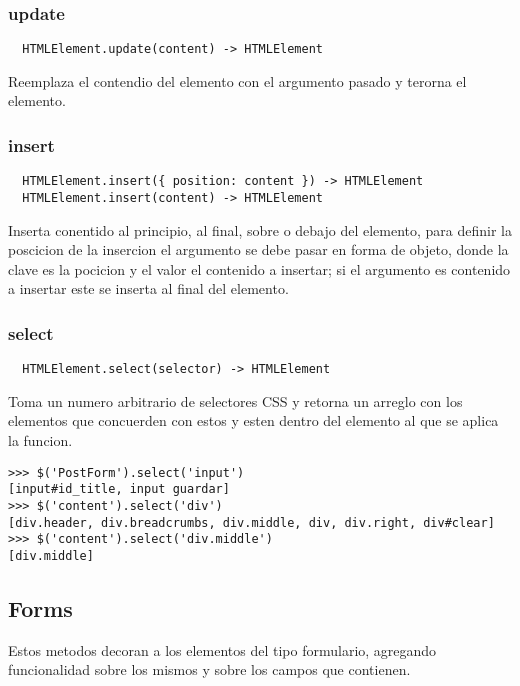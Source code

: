 \subsubsection*{update}
\begin{verbatim}
  HTMLElement.update(content) -> HTMLElement
\end{verbatim}
Reemplaza el contendio del elemento con el argumento pasado y terorna el
elemento.

\subsubsection*{insert}
\begin{verbatim}
  HTMLElement.insert({ position: content }) -> HTMLElement
  HTMLElement.insert(content) -> HTMLElement
\end{verbatim}
Inserta conentido al principio, al final, sobre o debajo del
elemento, para definir la poscicion de la insercion el argumento se debe pasar
en forma de objeto, donde la clave es la pocicion y el valor el contenido a
insertar; si el argumento es contenido a insertar este se inserta al final
del elemento.

\subsubsection*{select}
\begin{verbatim}
  HTMLElement.select(selector) -> HTMLElement
\end{verbatim}
Toma un numero arbitrario de selectores CSS y retorna un arreglo con los
elementos que concuerden con estos y esten dentro del elemento al que se aplica
la funcion.

\begin{lstlisting}[style=consola]
>>> $('PostForm').select('input')
[input#id_title, input guardar]
>>> $('content').select('div')
[div.header, div.breadcrumbs, div.middle, div, div.right, div#clear]
>>> $('content').select('div.middle')
[div.middle]
\end{lstlisting}


\subsection{Forms}
Estos metodos decoran a los elementos del tipo formulario, agregando
funcionalidad sobre los mismos y sobre los campos que contienen.
